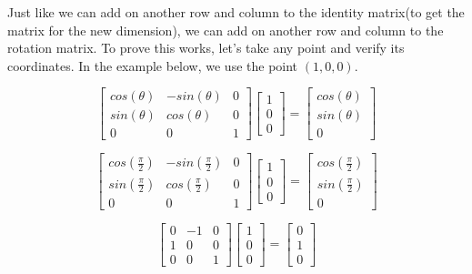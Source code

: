 \documentclass[14pt]{article}
\begin{document}
Just like we can add on another row and column to the identity matrix(to get the matrix for the new dimension), we can add on another row and column to the rotation matrix. To prove this works, let's take any point and verify its coordinates. In the example below, we use the point $(1, 0, 0)$.

\vspace*{1em}

\begin{equation}
	\begin{bmatrix}
	cos(\theta) & -sin(\theta) & 0 \\
	sin(\theta) & cos(\theta) & 0 \\ 
	0 & 0 & 1
	\end{bmatrix}
	\begin{bmatrix}
	1 \\
	0 \\ 
	0
	\end{bmatrix}	
	=
	\begin{bmatrix}
	cos(\theta) \\
	sin(\theta) \\ 
	0
	\end{bmatrix}
\end{equation}

\vspace*{1em}

\begin{equation}
	\begin{bmatrix}
	cos(\frac{\pi}{2}) & -sin(\frac{\pi}{2}) & 0 \\
	sin(\frac{\pi}{2}) & cos(\frac{\pi}{2}) & 0 \\ 
	0 & 0 & 1
	\end{bmatrix}
	\begin{bmatrix}
	1 \\
	0 \\ 
	0
	\end{bmatrix}	
	=
	\begin{bmatrix}
	cos(\frac{\pi}{2}) \\
	sin(\frac{\pi}{2}) \\ 
	0
	\end{bmatrix}
\end{equation}

\vspace*{1em}

\begin{equation}
	\begin{bmatrix}
	0 & -1 & 0 \\
	1 & 0 & 0 \\ 
	0 & 0 & 1
	\end{bmatrix}
	\begin{bmatrix}
	1 \\
	0 \\ 
	0
	\end{bmatrix}	
	=
	\begin{bmatrix}
	0 \\
	1 \\ 
	0
	\end{bmatrix}
\end{equation}
\end{document}

